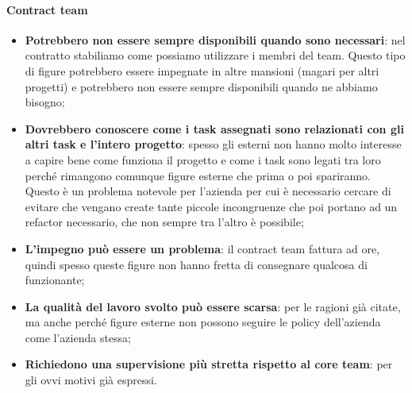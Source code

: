 \paragraph{Contract team}
\begin{itemize}
	\item \textbf{Potrebbero non essere sempre disponibili quando sono necessari}: nel contratto stabiliamo come possiamo utilizzare i membri del team. Questo tipo di figure potrebbero essere impegnate in altre mansioni (magari per altri progetti) e potrebbero non essere sempre disponibili quando ne abbiamo bisogno;
	\item \textbf{Dovrebbero conoscere come i task assegnati sono relazionati con gli altri task e l’intero progetto}: spesso gli esterni non hanno molto interesse a capire bene come funziona il progetto e come i task sono legati tra loro perché rimangono comunque figure esterne che prima o poi spariranno. Questo è un problema notevole per l'azienda per cui è necessario cercare di evitare che vengano create tante piccole incongruenze che poi portano ad un refactor necessario, che non sempre tra l'altro è possibile;
	\item \textbf{L’impegno può essere un problema}: il contract team fattura ad ore, quindi spesso queste figure non hanno fretta di consegnare qualcosa di funzionante;
	\item \textbf{La qualità del lavoro svolto può essere scarsa}: per le ragioni già citate, ma anche perché figure esterne non possono seguire le policy dell'azienda come l'azienda stessa;
	\item \textbf{Richiedono una supervisione più stretta rispetto al core team}: per gli ovvi motivi già espressi.
\end{itemize}


